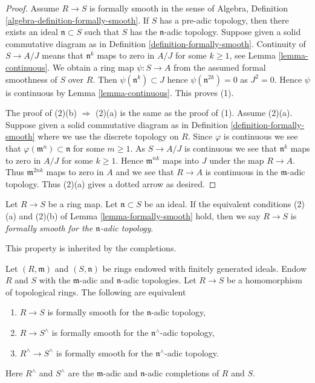 \begin{proof}
Assume $R \to S$ is formally smooth in
the sense of Algebra, Definition \ref{algebra-definition-formally-smooth}.
If $S$ has a pre-adic topology, then
there exists an ideal $\mathfrak n \subset S$ such that $S$ has the
$\mathfrak n$-adic topology. Suppose given a solid commutative diagram as in
Definition \ref{definition-formally-smooth}.
Continuity of $S \to A/J$ means that $\mathfrak n^k$ maps to zero
in $A/J$ for some $k \geq 1$, see Lemma \ref{lemma-continuous}.
We obtain a ring map $\psi : S \to A$ from the assumed formal smoothness of
$S$ over $R$. Then $\psi(\mathfrak n^k) \subset J$ hence
$\psi(\mathfrak n^{2k}) = 0$ as $J^2 = 0$. Hence $\psi$ is continuous by
Lemma \ref{lemma-continuous}. This proves (1).

\medskip\noindent
The proof of (2)(b) $\Rightarrow$ (2)(a) is the same as the proof of (1).
Assume (2)(a). Suppose given a solid commutative diagram as in
Definition \ref{definition-formally-smooth} where we use the discrete
topology on $R$. Since $\varphi$ is continuous we see that
$\varphi(\mathfrak m^n) \subset \mathfrak n$ for some $m \geq 1$.
As $S \to A/J$ is continuous we see that $\mathfrak n^k$ maps to
zero in $A/J$ for some $k \geq 1$. Hence $\mathfrak m^{nk}$ maps
into $J$ under the map $R \to A$. Thus $\mathfrak m^{2nk}$ maps to zero
in $A$ and we see that $R \to A$ is continuous in the $\mathfrak m$-adic
topology. Thus (2)(a) gives a dotted arrow as desired.
\end{proof}

\begin{definition}
\label{definition-formally-smooth-adic}
Let $R \to S$ be a ring map. Let $\mathfrak n \subset S$ be an
ideal. If the equivalent conditions (2)(a) and (2)(b) of
Lemma \ref{lemma-formally-smooth} hold, then we say
$R \to S$ is {\it formally smooth for the $\mathfrak n$-adic topology}.
\end{definition}

\noindent
This property is inherited by the completions.

\begin{lemma}
\label{lemma-formally-smooth-completion}
Let $(R, \mathfrak m)$ and $(S, \mathfrak n)$ be rings endowed
with finitely generated ideals. Endow $R$ and $S$ with the
$\mathfrak m$-adic and $\mathfrak n$-adic topologies.
Let $R \to S$ be a homomorphism of topological rings.
The following are equivalent
\begin{enumerate}
\item $R \to S$ is formally smooth for the $\mathfrak n$-adic topology,
\item $R \to S^\wedge$ is formally smooth for the $\mathfrak n^\wedge$-adic
topology,
\item $R^\wedge \to S^\wedge$ is formally smooth for the
$\mathfrak n^\wedge$-adic topology.
\end{enumerate}
Here $R^\wedge$ and $S^\wedge$ are the $\mathfrak m$-adic and
$\mathfrak n$-adic completions of $R$ and $S$.
\end{lemma}

